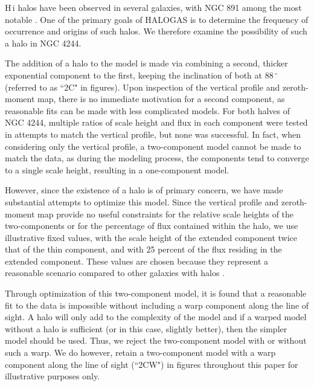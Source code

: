 \documentclass{emulateapj}
\begin{document}
\par
     {\sc H\,i} halos have been observed in several galaxies, with NGC 891 among the most notable \citep{2007AJ....134.1019O}.  One of the primary goals of HALOGAS is to determine the frequency of occurrence and origins of such halos.  We therefore examine the possibility of such a halo in NGC 4244. 

\par
     The addition of a halo to the model is made via combining a second, thicker exponential component to the first, keeping the inclination of both at $88\,^{\circ}$ (referred to as ``2C" in figures). Upon inspection of the vertical profile and zeroth-moment map, there is no immediate motivation for a second component, as reasonable fits can be made with less complicated models. For both halves of NGC 4244,  multiple ratios of scale height and flux in each component were tested in attempts to match the vertical profile, but none was successful. In fact, when considering only the vertical profile, a two-component model cannot be made to match the data, as during the modeling process, the components tend to converge to a single scale height, resulting in a one-component model. 

\par
     However, since the existence of a halo is of primary concern, we have made substantial attempts to optimize this model.  Since the vertical profile and zeroth-moment map provide no useful constraints for the relative scale heights of the two-components or for the percentage of flux contained within the halo, we use illustrative fixed values, with the scale height of the extended component twice that of the thin component, and with 25 percent of the flux residing in the extended component. These values are chosen because they represent a reasonable scenario compared to other galaxies with halos \citep{2007AJ....134.1019O}. 
   
\par
     Through optimization of this two-component model, it is found that a reasonable fit to the data is impossible without including a warp component along the line of sight. A halo will only add to the complexity of the model and if a warped model without a halo is sufficient (or in this case, slightly better), then the simpler model should be used.  Thus, we reject the two-component model with or without such a warp.  We do however, retain a two-component model with a warp component along the line of sight (``2CW") in figures throughout this paper for illustrative purposes only.
\end{document}
